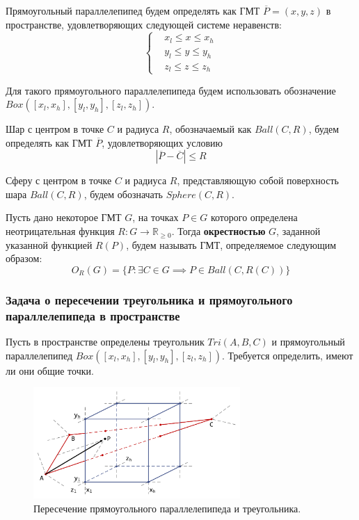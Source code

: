 Прямоугольный параллелепипед будем определять как ГМТ $\overline{P} = (x, y, z)$ в пространстве, удовлетворяющих следующей системе неравенств:
\begin{equation}\label{eqn:text_1_geo_prim_parallelepiped}
	\left\{
		\begin{aligned}
			& x_l \le x \le x_h \\
			& y_l \le y \le y_h \\
			& z_l \le z \le z_h
		\end{aligned}
	\right.
\end{equation}

Для такого прямоугольного параллелепипеда будем использовать обозначение $Box([x_l, x_h], [y_l, y_h], [z_l, z_h])$.

Шар с центром в точке $C$ и радиуса $R$, обозначаемый как $Ball(C, R)$, будем определять как ГМТ $\overline{P}$, удовлетворяющих условию
\begin{equation}
	|\overline{P} - \overline{C}| \le R
\end{equation}

Сферу с центром в точке $C$ и радиуса $R$, представляющую собой поверхность шара $Ball(C, R)$, будем обозначать $Sphere(C, R)$.

\begin{definition}
Пусть дано некоторое ГМТ $G$, на точках $P \in G$ которого определена неотрицательная функция $R: G \rightarrow \mathbb{R}_{\ge 0}$.
Тогда \textbf{окрестностью}\label{term:okrestnost} $G$, заданной указанной функцией $R(P)$, будем называть ГМТ, определяемое следующим образом:
\begin{equation}
	O_R(G) = \{ P: \exists C \in G \implies P \in Ball(C, R(C)) \}
\end{equation}
\end{definition}

\subsubsection{Задача о пересечении треугольника и прямоугольного параллелепипеда в пространстве}\label{sec:text_1_geo_prim_tri_and_parallelepiped_int}

Пусть в пространстве определены треугольник $Tri(A, B, C)$ и прямоугольный параллелепипед $Box([x_l, x_h], [y_l, y_h], [z_l, z_h])$.
Требуется определить, имеют ли они общие точки.

\begin{figure}[ht]
	\centering
	\includegraphics[width=0.7\textwidth]{./pics/text_1_geo_prim/tri_block_intersect.pdf}
	\caption{Пересечение прямоугольного параллелепипеда и треугольника.}
	\label{fig:text_1_geo_prim_tri_block_intersect}
\end{figure}

